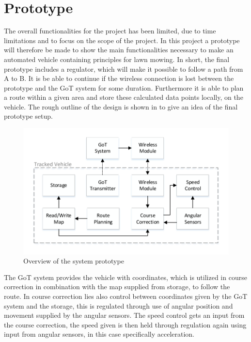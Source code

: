 \section{Prototype}
The overall functionalities for the project has been limited, due to time limitations and to focus on the scope of the project. In this project a prototype will therefore be made to show the main functionalities necessary to make an automated vehicle containing principles for lawn mowing.
In short, the final prototype includes a regulator, which will make it possible to follow a path from A to B. It is be able to continue if the wireless connection is lost between the prototype and the GoT system for some duration. Furthermore it is able to plan a route within a given area and store these calculated data points locally, on the vehicle. The rough outline of the design is shown in  to give an idea of the final prototype setup.

\begin{figure}[H]
	\centering
	\includegraphics[scale=.9]{figures/systemOverview1}
	\caption{Overview of the system prototype}
	\label{fig:systemOverview1}
\end{figure}

The GoT system provides the vehicle with coordinates, which is utilized in course correction in combination with the map supplied from storage, to follow the route. In course correction lies also control between coordinates given by the GoT system and the storage, this is regulated through use of angular position and movement supplied by the angular sensors. The speed control gets an input from the course correction, the speed given is then held through regulation again using input from angular sensors, in this case specifically acceleration.

